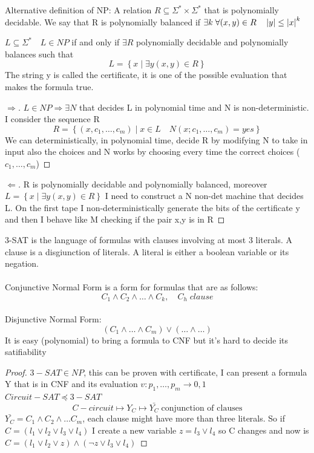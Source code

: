Alternative definition of NP: A relation $ R \subseteq \Sigma^* \times \Sigma^*$ that is polynomially decidable. We say that R is polynomially balanced if $\exists k \; \forall (x,y) \in R \quad \left\lvert y\right\rvert \leq \left\lvert x\right\rvert^k$

\begin{theorem}
    $L \subseteq \Sigma^* \quad L \in NP$ if and only if $\exists R$ polynomially decidable and polynomially balances such that
    \[ 
        L = \left\{ x \mid \exists y (x,y) \in R \right\} 
    \]
    The string y is called the certificate, it is one of the possible evaluation that makes the formula true.
    \begin{proof}[$\Rightarrow$]
        $ L \in NP \Rightarrow \exists N$ that decides L in polynomial time and N is non-deterministic. I consider the sequence R
        \[ 
            R = \left\{ (x,c_1, \ldots, c_m) \mid x \in L \quad N(x; c_1, \ldots, c_m) = yes \right\} 
        \]
        We can deterministically, in polynomial time, decide R by modifying N to take in input also the choices and N works by choosing every time the correct choices ($c_1, \ldots, c_m$)
    \end{proof}
    \begin{proof}[$\Leftarrow$]
        R is polynomially decidable and polynomially balanced, moreover $L = \left\{ x \mid \exists y (x,y) \in R \right\} $
        I need to construct a N non-det machine that decides L. On the first tape I non-deterministically generate the bits of the certificate y and then I behave like M checking if the pair x,y is in R
    \end{proof}
\end{theorem}

\begin{proposition}
    3-SAT is the language of formulas with clauses involving at most 3 literals. A clause is a disgiunction of literals. A literal is either a boolean variable or its negation.\\\\
    Conjunctive Normal Form is a form for formulas that are as follows:
    \[ 
        C_1 \wedge C_2 \wedge \ldots \wedge C_k, \quad C_h \; clause 
    \]\\
    Disjunctive Normal Form:
    \[ 
        (C_1 \wedge \ldots \wedge C_m) \vee (\ldots \wedge \ldots) 
    \]
    It is easy (polynomial) to bring a formula to CNF but it's hard to decide its satifiability

    \begin{proof}
        $3-SAT \in NP$, this can be proven with certificate, I can present a formula Y that is in CNF and its evaluation $v:{p_{1}, \ldots,p_{m}} \longrightarrow{0,1}$\\
        $Circuit-SAT \preceq 3-SAT$
        \[ 
            C-circuit \mapsto Y_C \mapsto \bar{Y_C} \; \text{conjunction of clauses}
        \]
        $\bar{Y_C} = C_1 \wedge C_2 \wedge \ldots C_m$, each clause might have more than three literals. So if $C = (l_1 \vee l_2 \vee l_3 \vee l_4)$ I create a new variable $z = l_3 \vee l_4$ so C changes and now is $C = (l_1 \vee l_2 \vee z) \wedge ( \neg z \vee l_3 \vee l_4)$
    \end{proof}
\end{proposition}

